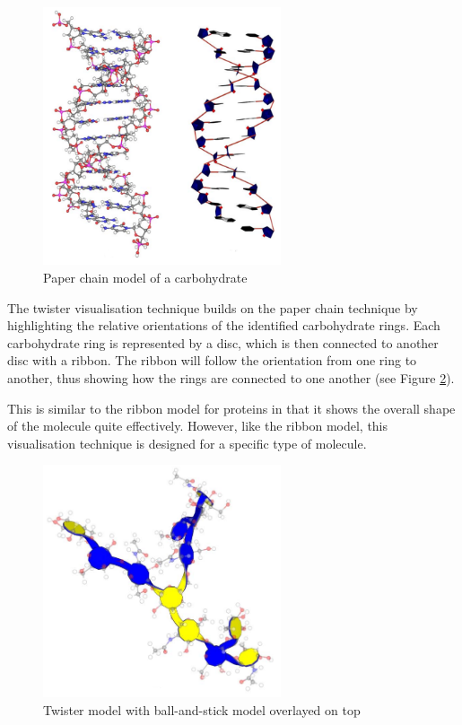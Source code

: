\begin{figure}[h!]
  \begin{center}
    \includegraphics[width=70mm]{paper_chain}
  \end{center}
  \caption{Paper chain model of a carbohydrate}
  \label{fig:background_paperchain}
\end{figure}

The twister visualisation technique \citep{kuttel06} builds on the paper chain
technique by highlighting the relative orientations of the identified
carbohydrate rings. Each carbohydrate ring is represented by a disc, which is
then connected to another disc with a ribbon. The ribbon will follow the
orientation from one ring to another, thus showing how the rings are connected
to one another (see Figure \ref{fig:background_twister}).

This is similar to the ribbon model for proteins in that it shows the overall
shape of the molecule quite effectively. However, like the ribbon model, this
visualisation technique is designed for a specific type of molecule.

\begin{figure}[h!]
  \begin{center}
    \includegraphics[width=70mm]{twister}
  \end{center}
  \caption{Twister model with ball-and-stick model overlayed on top}
  \label{fig:background_twister}
\end{figure}

